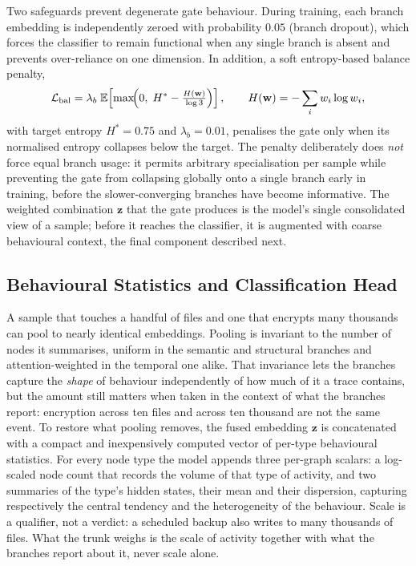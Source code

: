 \documentclass[%
    BCOR=10mm,
    DIV=13,
    toc=bibliography,
    toc=listof,
    oneside,
    12pt,
]{scrbook}
\begin{document}
Two safeguards prevent degenerate gate behaviour. During training, each branch
embedding is independently zeroed with probability $0.05$ (branch dropout),
which forces the classifier to remain functional when any single branch is
absent and prevents over-reliance on one dimension. In addition, a soft
entropy-based balance penalty,
\begin{equation}
  \mathcal{L}_{\mathrm{bal}}
  = \lambda_{b}\;
    \mathbb{E}\!\left[
      \max\!\Bigl( 0,\; H^{*} - \tfrac{H(\mathbf{w})}{\log 3} \Bigr)
    \right],
  \qquad
  H(\mathbf{w}) = -\sum_{i} w_i \log w_i,
  \label{eq:branch_balance}
\end{equation}
with target entropy $H^{*} = 0.75$ and $\lambda_b = 0.01$, penalises the gate
only when its normalised entropy collapses below the target. The penalty
deliberately does \emph{not} force equal branch usage: it permits arbitrary
specialisation per sample while preventing the gate from collapsing globally
onto a single branch early in training, before the slower-converging branches
have become informative. The weighted combination $\mathbf{z}$ that the gate
produces is the model's single consolidated view of a sample; before it reaches
the classifier, it is augmented with coarse behavioural context, the final
component described next.

\subsection{Behavioural Statistics and Classification Head}
\label{subsec:classifier}

A sample that touches a handful of files and one that encrypts many thousands
can pool to nearly identical embeddings. Pooling is invariant to the number of
nodes it summarises, uniform in the semantic and structural branches and
attention-weighted in the temporal one alike. That invariance lets the branches
capture the \emph{shape} of behaviour independently of how much of it a trace
contains, but the amount still matters when taken in the context of what the
branches report: encryption across ten files and across ten thousand are not
the same event. To restore what
pooling removes, the fused embedding $\mathbf{z}$ is concatenated with a compact
and inexpensively computed vector of per-type behavioural statistics. For every
node type the model appends three per-graph scalars: a log-scaled node count
that records the volume of that type of activity, and two summaries of the
type's hidden states, their mean and their dispersion, capturing respectively
the central tendency and the heterogeneity of the behaviour. Scale is a
qualifier, not a verdict: a scheduled backup also writes to many thousands of
files. What the trunk weighs is the scale of activity together with what the
branches report about it, never scale alone.
\end{document}
